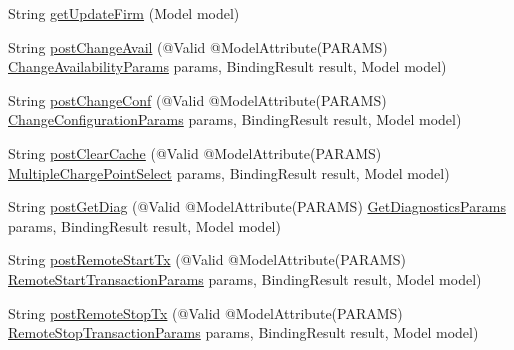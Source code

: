 \begin{DoxyCompactItemize}
\item 
String \hyperlink{classde_1_1rwth_1_1idsg_1_1steve_1_1web_1_1controller_1_1_ocpp12_controller_a3621b1004614429191495e1d09a43f55}{get\-Update\-Firm} (Model model)
\item 
String \hyperlink{classde_1_1rwth_1_1idsg_1_1steve_1_1web_1_1controller_1_1_ocpp12_controller_abaeab8160f3e37d085a17907c5ba3ba5}{post\-Change\-Avail} (@Valid @Model\-Attribute(P\-A\-R\-A\-M\-S) \hyperlink{classde_1_1rwth_1_1idsg_1_1steve_1_1web_1_1dto_1_1ocpp12_1_1_change_availability_params}{Change\-Availability\-Params} params, Binding\-Result result, Model model)
\item 
String \hyperlink{classde_1_1rwth_1_1idsg_1_1steve_1_1web_1_1controller_1_1_ocpp12_controller_a1a700fdabd79c497f3159bf54645dbf3}{post\-Change\-Conf} (@Valid @Model\-Attribute(P\-A\-R\-A\-M\-S) \hyperlink{classde_1_1rwth_1_1idsg_1_1steve_1_1web_1_1dto_1_1ocpp12_1_1_change_configuration_params}{Change\-Configuration\-Params} params, Binding\-Result result, Model model)
\item 
String \hyperlink{classde_1_1rwth_1_1idsg_1_1steve_1_1web_1_1controller_1_1_ocpp12_controller_a16ac866a189cc842c6865e28d1f84b19}{post\-Clear\-Cache} (@Valid @Model\-Attribute(P\-A\-R\-A\-M\-S) \hyperlink{classde_1_1rwth_1_1idsg_1_1steve_1_1web_1_1dto_1_1common_1_1_multiple_charge_point_select}{Multiple\-Charge\-Point\-Select} params, Binding\-Result result, Model model)
\item 
String \hyperlink{classde_1_1rwth_1_1idsg_1_1steve_1_1web_1_1controller_1_1_ocpp12_controller_a79f43d7def1a7c10bd6822eb40bf4c53}{post\-Get\-Diag} (@Valid @Model\-Attribute(P\-A\-R\-A\-M\-S) \hyperlink{classde_1_1rwth_1_1idsg_1_1steve_1_1web_1_1dto_1_1common_1_1_get_diagnostics_params}{Get\-Diagnostics\-Params} params, Binding\-Result result, Model model)
\item 
String \hyperlink{classde_1_1rwth_1_1idsg_1_1steve_1_1web_1_1controller_1_1_ocpp12_controller_a6bc5b962a7a6eaf48a1881ccf297d796}{post\-Remote\-Start\-Tx} (@Valid @Model\-Attribute(P\-A\-R\-A\-M\-S) \hyperlink{classde_1_1rwth_1_1idsg_1_1steve_1_1web_1_1dto_1_1common_1_1_remote_start_transaction_params}{Remote\-Start\-Transaction\-Params} params, Binding\-Result result, Model model)
\item 
String \hyperlink{classde_1_1rwth_1_1idsg_1_1steve_1_1web_1_1controller_1_1_ocpp12_controller_a8389e98d971ea57de02bb19ab6966e5a}{post\-Remote\-Stop\-Tx} (@Valid @Model\-Attribute(P\-A\-R\-A\-M\-S) \hyperlink{classde_1_1rwth_1_1idsg_1_1steve_1_1web_1_1dto_1_1common_1_1_remote_stop_transaction_params}{Remote\-Stop\-Transaction\-Params} params, Binding\-Result result, Model model)

\end{DoxyCompactItemize}
